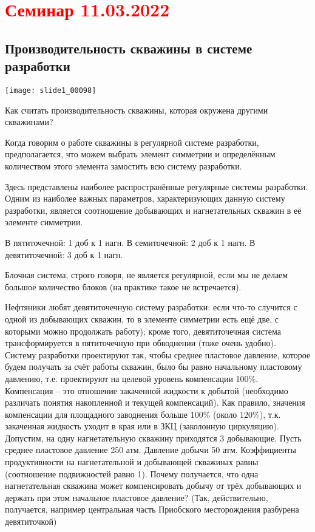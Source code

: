 \documentclass[main.tex]{subfiles}
\begin{document}
\section{\textcolor{red}{Семинар 11.03.2022}}

\subsection{Производительность скважины в системе разработки}

\texttt{[image: slide1\_00098]}

Как считать производительность скважины, которая окружена другими скважинами?

Когда говорим о работе скважины в регулярной системе разработки, предполагается, что можем выбрать элемент симметрии и определённым количеством этого элемента замостить всю систему разработки.

Здесь представлены наиболее распространённые регулярные системы разработки. Одним из наиболее важных параметров, характеризующих данную систему разработки, является соотношение добывающих и нагнетательных скважин в её элементе симметрии.

В пятиточечной: 1 доб к 1 нагн. В семиточечной: 2 доб к 1 нагн. В девятиточечной: 3 доб к 1 нагн.

Блочная система, строго говоря, не является регулярной, если мы не делаем большое количество блоков (на практике такое не встречается).

Нефтяники любят девятиточечную систему разработки: если что-то случится с одной из добывающих скважин, то в элементе симметрии есть ещё две, с которыми можно продолжать работу); кроме того, девятиточечная система трансформируется в пятиточечную при обводнении (тоже очень удобно).\\

Систему разработки проектируют так, чтобы среднее пластовое давление, которое будем получать за счёт работы скважин, было бы равно начальному пластовому давлению, т.е. проектируют на целевой уровень компенсации 100\%.\\

Компенсация -- это отношение закаченной жидкости к добытой (необходимо различать понятия накопленной и текущей компенсаций). Как правило, значения компенсации для площадного заводнения больше 100\% (около 120\%), т.к. закаченная жидкость уходит в края или в ЗКЦ (заколонную циркуляцию).\\

Допустим, на одну нагнетательную скважину приходятся 3 добывающие. Пусть среднее пластовое давление 250 атм. Давление добычи 50 атм. Коэффициенты продуктивности на нагнетательной и добывающей скважинах равны (соотношение подвижностей равно 1). Почему получается, что одна нагнетательная скважина может компенсировать добычу от трёх добывающих и держать при этом начальное пластовое давление? (Так, действительно, получается, например центральная часть Приобского месторождения разбурена девятиточкой)\\
\end{document}
